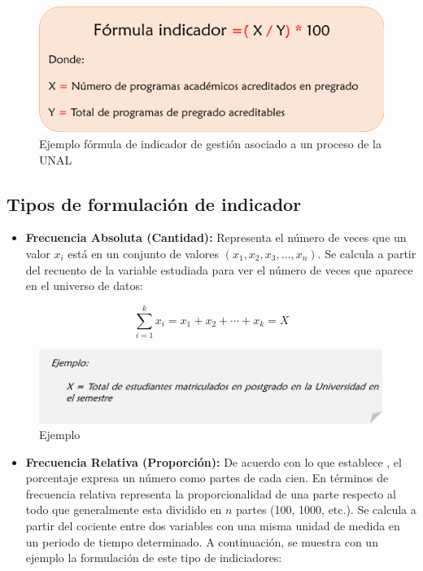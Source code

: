 \documentclass[
]{book}
\providecommand{\tightlist}{%
  \setlength{\itemsep}{0pt}\setlength{\parskip}{0pt}}
\begin{document}
\begin{figure}

{\centering \includegraphics[width=0.7\linewidth]{Imagenes/figura_10} 

}

\caption{Ejemplo fórmula de indicador de gestión asociado a un proceso de la UNAL}\label{fig:figura10}
\end{figure}

\hypertarget{tipos-de-formulaciuxf3n-de-indicador}{%
\subsection{Tipos de formulación de indicador}\label{tipos-de-formulaciuxf3n-de-indicador}}

\begin{itemize}
\tightlist
\item
  \textbf{Frecuencia Absoluta (Cantidad):}
  Representa el número de veces que un valor \(x_i\) está en un conjunto de valores \((x_1, x_2, x_3, …, x_n)\). Se calcula a partir del recuento de la variable estudiada para ver el número de veces que aparece en el universo de datos:
\end{itemize}

\[
\sum_{i=1}^{k}x_i=x_1+x_2+\cdots+x_k=X
\]

\begin{figure}

{\centering \includegraphics[width=0.7\linewidth]{Imagenes/texto_1} 

}

\caption{Ejemplo}\label{fig:unnamed-chunk-5}
\end{figure}

\begin{itemize}
\tightlist
\item
  \textbf{Frecuencia Relativa (Proporción):}
  De acuerdo con lo que establece \citet{coneval2013manual}, el porcentaje expresa un número como partes de cada cien. En términos de frecuencia relativa representa la proporcionalidad de una parte respecto al todo que generalmente esta dividido en \(n\) partes (100, 1000, etc.). Se calcula a partir del cociente entre dos variables con una misma unidad de medida en un periodo de tiempo determinado. A continuación, se muestra con un ejemplo la formulación de este tipo de indiciadores:
\end{itemize}
\end{document}
